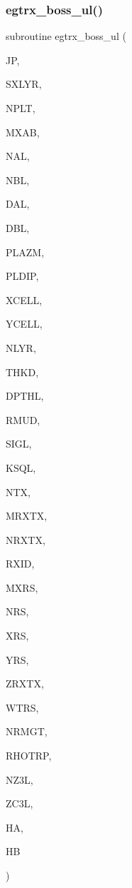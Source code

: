 \subsubsection{\texorpdfstring{egtrx\+\_\+boss\+\_\+ul()}{egtrx\_boss\_ul()}}
{\footnotesize\ttfamily subroutine egtrx\+\_\+boss\+\_\+ul (\begin{DoxyParamCaption}\item[{integer}]{JP,  }\item[{integer}]{S\+X\+L\+YR,  }\item[{integer}]{N\+P\+LT,  }\item[{integer}]{M\+X\+AB,  }\item[{integer}]{N\+AL,  }\item[{integer}]{N\+BL,  }\item[{real}]{D\+AL,  }\item[{real}]{D\+BL,  }\item[{real, dimension (nplt)}]{P\+L\+A\+ZM,  }\item[{real, dimension (nplt)}]{P\+L\+D\+IP,  }\item[{real, dimension (mxab,nplt)}]{X\+C\+E\+LL,  }\item[{real, dimension (mxab,nplt)}]{Y\+C\+E\+LL,  }\item[{integer}]{N\+L\+YR,  }\item[{real (kind=ql), dimension(nlyr)}]{T\+H\+KD,  }\item[{real (kind=ql), dimension(nlyr)}]{D\+P\+T\+HL,  }\item[{real (kind=ql), dimension(0\+:nlyr)}]{R\+M\+UD,  }\item[{complex(kind=ql), dimension(nlyr)}]{S\+I\+GL,  }\item[{complex(kind=ql), dimension(nlyr)}]{K\+S\+QL,  }\item[{integer}]{N\+TX,  }\item[{integer}]{M\+R\+X\+TX,  }\item[{integer, dimension(ntx)}]{N\+R\+X\+TX,  }\item[{integer, dimension(mrxtx,ntx)}]{R\+X\+ID,  }\item[{integer}]{M\+X\+RS,  }\item[{integer, dimension(mrxtx,ntx)}]{N\+RS,  }\item[{real, dimension (mxrs,mrxtx,ntx)}]{X\+RS,  }\item[{real, dimension (mxrs,mrxtx,ntx)}]{Y\+RS,  }\item[{real, dimension (mrxtx,ntx)}]{Z\+R\+X\+TX,  }\item[{real, dimension (mxrs,mrxtx,ntx)}]{W\+T\+RS,  }\item[{integer}]{N\+R\+M\+GT,  }\item[{real, dimension(nrmgt)}]{R\+H\+O\+T\+RP,  }\item[{integer}]{N\+Z3L,  }\item[{real, dimension(nz3l)}]{Z\+C3L,  }\item[{complex, dimension (mxab,3,mrxtx,ntx,nplt)}]{HA,  }\item[{complex, dimension (mxab,3,mrxtx,ntx,nplt)}]{HB }\end{DoxyParamCaption})}

